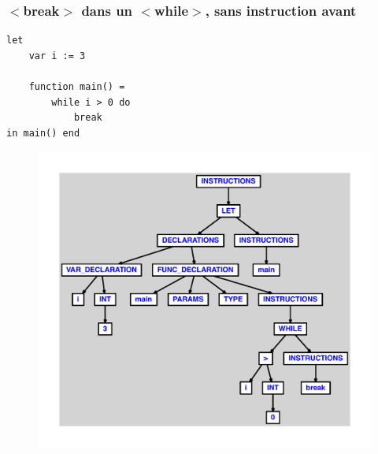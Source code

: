 \documentclass{article}
\begin{document}
\subsubsection{$ < $break$ > $ dans un $ < $while$ > $, sans instruction avant}
\begin{lstlisting}
let
	var i := 3

	function main() =
		while i > 0 do
			break
in main() end
\end{lstlisting}
\newpage
\begin{figure}[H]
\centering
\includegraphics[max width=\textwidth]{ast/ast_15.pdf}
\end{figure}
\newpage
\end{document}
